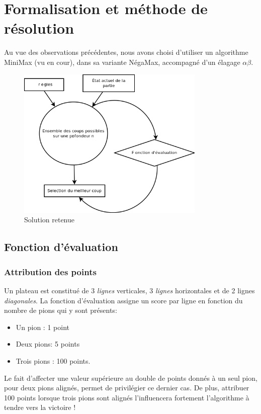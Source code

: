 \documentclass[a4paper,12pt]{article}
\begin{document}
\section{Formalisation et méthode de résolution}
Au vue des observations précédentes, nous avons choisi d'utiliser un algorithme MiniMax (vu en cour), dans sa variante NégaMax, accompagné d'un élagage $\alpha\beta$.
\begin{figure}[h]
    \includegraphics[width=0.8\textwidth]{./pix/methode.png}
    \centering
    \caption{Solution retenue}
\end{figure}

\subsection{Fonction d'évaluation}
\subsubsection{Attribution des points}
Un plateau est constitué de 3 \emph{lignes} verticales, 3 \emph{lignes} horizontales et de 2 lignes \emph{diagonales}. La fonction d'évaluation assigne un score par ligne en fonction du nombre de pions qui y sont présents:
\vspace{1em} %
\begin{itemize}
	\item Un pion : 1 point
	\item Deux pions: 5 points
	\item Trois pions : 100 points.
\end{itemize}
\vspace{1em} %
Le fait d'affecter une valeur supérieure au double de points donnés à un seul pion, pour deux pions alignés, permet de privilégier ce dernier cas. De plus, attribuer 100 points lorsque trois pions sont alignés l'influencera fortement l'algorithme à tendre vers la victoire !
\end{document}
